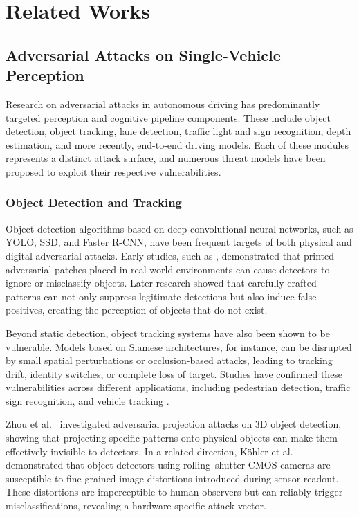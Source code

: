 \chapter{Related Works}
\label{related-works}


\section{Adversarial Attacks on Single-Vehicle Perception}

Research on adversarial attacks in autonomous driving has predominantly targeted perception and cognitive pipeline components.
These include object detection, object tracking, lane detection, traffic light and sign recognition, depth estimation, and more recently, end-to-end driving models.
Each of these modules represents a distinct attack surface, and numerous threat models have been proposed to exploit their respective vulnerabilities.

\subsection{Object Detection and Tracking}

Object detection algorithms based on deep convolutional neural networks, such as YOLO, SSD, and Faster R-CNN, have been frequent targets of both physical and digital adversarial attacks.
Early studies, such as \cite{DBLP:journalscorrabs-1712-09665}, demonstrated that printed adversarial patches placed in real-world environments can cause detectors to ignore or misclassify objects.
Later research showed that carefully crafted patterns can not only suppress legitimate detections but also induce false positives, creating the perception of objects that do not exist.

Beyond static detection, object tracking systems have also been shown to be vulnerable.
Models based on Siamese architectures, for instance, can be disrupted by small spatial perturbations or occlusion-based attacks, leading to tracking drift, identity switches, or complete loss of target.
Studies have confirmed these vulnerabilities across different applications, including pedestrian detection, traffic sign recognition, and vehicle tracking \cite{10.11453372297.3423359,10.11453548606.3559390}.

Zhou et al.\ \cite{zhou2024transientadversarial3dprojection} investigated adversarial projection attacks on 3D object detection, showing that projecting specific patterns onto physical objects can make them effectively invisible to detectors.
In a related direction, Köhler et al.\ \cite{köhler2021rollininherentvulnerabilityrolling} demonstrated that object detectors using rolling–shutter CMOS cameras are susceptible to fine-grained image distortions introduced during sensor readout.
These distortions are imperceptible to human observers but can reliably trigger misclassifications, revealing a hardware-specific attack vector.

